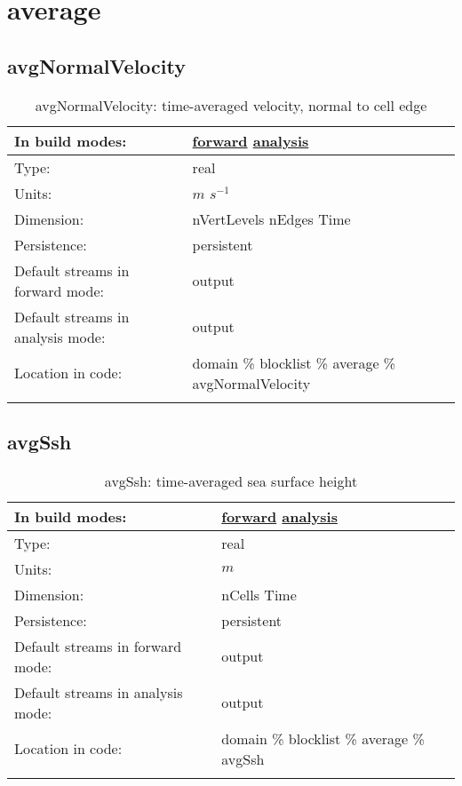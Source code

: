 \section[average]{average}
\label{sec:var_sec_average}
\subsection[avgNormalVelocity]{avgNormalVelocity}
\label{subsec:var_sec_average_avgNormalVelocity}
\begin{center}
\begin{longtable}{| p{2.0in} | p{4.0in} |}
        \hline 
        In build modes: & \hyperref[subsec:forward_var_tab_average]{forward} \hyperref[subsec:analysis_var_tab_average]{analysis} \\
        \hline 
        Type: & real \\
        \hline 
        Units: & $m$ $s^{-1}$ \\
        \hline 
        Dimension: & nVertLevels nEdges Time \\
        \hline 
        Persistence: & persistent \\
        \hline 
		 Default streams in forward mode: &  output \\
        \hline 
		 Default streams in analysis mode: &  output \\
        \hline 
		 Location in code: & domain \% blocklist \% average \% avgNormalVelocity \\
		 \hline 
    \caption{avgNormalVelocity: time-averaged velocity, normal to cell edge}
\end{longtable}
\end{center}
\subsection[avgSsh]{avgSsh}
\label{subsec:var_sec_average_avgSsh}
\begin{center}
\begin{longtable}{| p{2.0in} | p{4.0in} |}
        \hline 
        In build modes: & \hyperref[subsec:forward_var_tab_average]{forward} \hyperref[subsec:analysis_var_tab_average]{analysis} \\
        \hline 
        Type: & real \\
        \hline 
        Units: & $m$ \\
        \hline 
        Dimension: & nCells Time \\
        \hline 
        Persistence: & persistent \\
        \hline 
		 Default streams in forward mode: &  output \\
        \hline 
		 Default streams in analysis mode: &  output \\
        \hline 
		 Location in code: & domain \% blocklist \% average \% avgSsh \\
		 \hline 
    \caption{avgSsh: time-averaged sea surface height}
\end{longtable}
\end{center}

